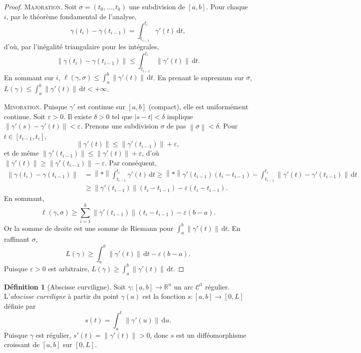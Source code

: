 \documentclass[12pt,a4paper,openany]{book}
\theoremstyle{definition}
\newtheorem{definition}{Définition}[chapter]
\newcommand{\R}{\mathbb{R}}
\newcommand{\eps}{\varepsilon}
\newcommand{\abs}[1]{\left\lvert #1 \right\rvert}
\newcommand{\norm}[1]{\left\lVert #1 \right\rVert}
\newcommand{\dd}{\mathrm{d}}
\begin{document}
\begin{proof}
  \textsc{Majoration.} Soit $\sigma = (t_0,\ldots,t_k)$ une
  subdivision de $[a,b]$. Pour chaque $i$, par le théorème fondamental
  de l'analyse,
  \[
    \gamma(t_i) - \gamma(t_{i-1}) = \int_{t_{i-1}}^{t_i}
    \gamma'(t)\,\dd t,
  \]
  d'où, par l'inégalité triangulaire pour les intégrales,
  \[
    \norm{\gamma(t_i) - \gamma(t_{i-1})}
    \leqslant \int_{t_{i-1}}^{t_i} \norm{\gamma'(t)}\,\dd t.
  \]
  En sommant sur $i$,
  $\ell(\gamma,\sigma) \leqslant \int_a^b\norm{\gamma'(t)}\,\dd t$.
  En prenant le supremum sur $\sigma$,
  $L(\gamma) \leqslant \int_a^b\norm{\gamma'(t)}\,\dd t < +\infty$.

  \textsc{Minoration.} Puisque $\gamma'$ est continue sur $[a,b]$
  (compact), elle est uniformément continue. Soit $\eps > 0$. Il existe
  $\delta > 0$ tel que $\abs{s-t} < \delta$ implique
  $\norm{\gamma'(s)-\gamma'(t)} < \eps$. Prenons une subdivision
  $\sigma$ de pas $\norm{\sigma} < \delta$. Pour $t \in [t_{i-1},t_i]$,
  \[
    \norm{\gamma'(t)} \leqslant \norm{\gamma'(t_{i-1})} + \eps,
  \]
  et de même $\norm{\gamma'(t_{i-1})} \leqslant \norm{\gamma'(t)}+\eps$,
  d'où $\norm{\gamma'(t)} \geqslant \norm{\gamma'(t_{i-1})} - \eps$.
  Par conséquent,
  \begin{align*}
    \norm{\gamma(t_i)-\gamma(t_{i-1})}
    &= \norm*{\int_{t_{i-1}}^{t_i}\gamma'(t)\,\dd t}
    \geqslant \norm*{\gamma'(t_{i-1})(t_i-t_{i-1})}
    - \int_{t_{i-1}}^{t_i}\norm{\gamma'(t)-\gamma'(t_{i-1})}\,\dd t \\
    &\geqslant \norm{\gamma'(t_{i-1})}(t_i-t_{i-1})
    - \eps(t_i-t_{i-1}).
  \end{align*}
  En sommant,
  \[
    \ell(\gamma,\sigma) \geqslant
    \sum_{i=1}^k\norm{\gamma'(t_{i-1})}(t_i-t_{i-1})
    - \eps(b-a).
  \]
  Or la somme de droite est une somme de Riemann pour
  $\int_a^b\norm{\gamma'(t)}\,\dd t$. En raffinant $\sigma$,
  \[
    L(\gamma) \geqslant \int_a^b\norm{\gamma'(t)}\,\dd t - \eps(b-a).
  \]
  Puisque $\eps > 0$ est arbitraire,
  $L(\gamma) \geqslant \int_a^b\norm{\gamma'(t)}\,\dd t$.
\end{proof}

\begin{definition}[Abscisse curviligne]\label{def:abscisse-curviligne}
  Soit $\gamma\colon[a,b]\to\R^n$ un arc $\mathcal{C}^1$ régulier.
  L'\emph{abscisse curviligne} à partir du point $\gamma(a)$ est la
  fonction $s\colon[a,b]\to[0,L]$ définie par
  \[
    s(t) = \int_a^t \norm{\gamma'(u)}\,\dd u.
  \]
  Puisque $\gamma$ est régulier, $s'(t) = \norm{\gamma'(t)} > 0$, donc
  $s$ est un difféomorphisme croissant de $[a,b]$ sur $[0,L]$.
\end{definition}
\end{document}
